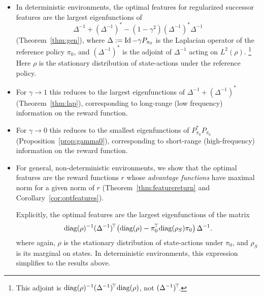 \documentclass[11pt,a4paper]{article}
\newcommand{\AK}{\mathcal{A}}
\newcommand{\option}[1]{{\color[rgb]{.4,0,.8}[Optional:#1]}} %
\renewcommand{\option}[1]{}  %
\begin{document}
\begin{itemize}
\item In deterministic environments, the optimal features for regularized
successor features are the largest eigenfunctions of
\begin{equation}
\Delta^{-1}+(\Delta^{-1})^{\ast}-(1-\gamma^2)
(\Delta^{-1})^\ast \Delta^{-1}
\end{equation}
(Theorem~\ref{thm:gen}),
where $\Delta\mathrel{\mathop{:}}= \operatorname{Id}-\gamma P_{\pi_0}$ is the Laplacian operator of the
reference policy $\pi_0$,
and $(\Delta^{-1})^\ast$
is the adjoint of $\Delta^{-1}$ acting on
$L^2(\rho)$. \footnote{This adjoint is
$\operatorname{diag}(\rho)^{-1}(\Delta^{-1})^{\!\top}\!\operatorname{diag}(\rho)$, not
$(\Delta^{-1})^{\!\top}\!$.} Here $\rho$ is the stationary distribution of
state-actions under
the reference policy.

\item
For $\gamma\to 1$ this reduces to the largest eigenfunctions of
$\Delta^{-1}+(\Delta^{-1})^{\ast}$ (Theorem~\ref{thm:lap}), corresponding
to long-range (low frequency) information on the reward function.

\item For $\gamma\to 0$ this reduces to the smallest eigenfunctions of
$P_{\pi_0}^\ast P_{\pi_0}$ (Proposition~\ref{prop:gamma0}), corresponding
to short-range (high-frequency) information on the reward function.

\item For general, non-deterministic environments, 
we show that the optimal features are the reward
functions $r$ whose \emph{advantage functions} have maximal norm for a
given norm of $r$ (Theorem~\ref{thm:featurereturn} and
Corollary~\ref{cor:optfeatures}). 
\option{More precisely, the optimal features are the largest
eigenfunctions of the self-adjoint operator
$\diag(\rho)^{-1}\AK_{\pi_0}$, where $\AK_{\pi_0}$ is the unique
symmetric positive semidefinite matrix such that for any reward $r$, the
norm of its advantage function $A^{\pi_0}_r$ is
$\norm{A^{\pi_0}_r}^2_{L^2(\rho)}=\transp{r} \AK_{\pi_0} r$
(Definition~\ref{def:AK}).}

Explicitly, the optimal features are the
largest eigenfunctions of the matrix
\begin{equation}
\operatorname{diag}(\rho)^{-1} (\Delta^{-1})^{\!\top}\!\left(
\operatorname{diag}(\rho)-\pi_0^{\!\top}\!\operatorname{diag}(\rho_S)\pi_0\right)\Delta^{-1}.
\end{equation}
where again, $\rho$ is the stationary distribution of state-actions under
$\pi_0$, and $\rho_S$ is its marginal on states.
In deterministic environments, this expression simplifies to 
the results above.


\end{itemize}
\end{document}
